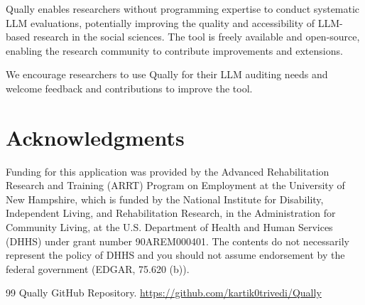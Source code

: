 \documentclass[11pt,a4paper]{article}
\begin{document}
Qually enables researchers without programming expertise to conduct systematic LLM evaluations, potentially improving the quality and accessibility of LLM-based research in the social sciences. The tool is freely available and open-source, enabling the research community to contribute improvements and extensions.

We encourage researchers to use Qually for their LLM auditing needs and welcome feedback and contributions to improve the tool.

\section*{Acknowledgments}
Funding for this application was provided by the Advanced Rehabilitation Research and Training (ARRT) Program on Employment at the University of New Hampshire, which is funded by the National Institute for Disability, Independent Living, and Rehabilitation Research, in the Administration for Community Living, at the U.S. Department of Health and Human Services (DHHS) under grant number 90AREM000401. The contents do not necessarily represent the policy of DHHS and you should not assume endorsement by the federal government (EDGAR, 75.620 (b)).

\begin{thebibliography}{99}
 Qually GitHub Repository. \url{https://github.com/kartik0trivedi/Qually}
\end{thebibliography}
\end{document}

